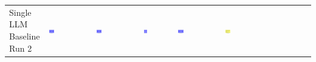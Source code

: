 \begin{table}
\begin{tabular}{@{}mmmmmm@{}}
    \makecell{Single LLM \\ Baseline \\ Run 2} & \includegraphics[width=0.13\textwidth]{./run_2/png/gpt-4o_results/MicrofluidicChip.png} & \includegraphics[width=0.13\textwidth]{./run_2/png/o1-preview_results/MicrofluidicChip.png} & \includegraphics[width=0.13\textwidth]{./run_2/png/claude-3-5-sonnet-20240620_results/MicrofluidicChip.png} & \includegraphics[width=0.13\textwidth]{./run_2/png/watsonx_meta-llama_llama-3-1-70b-instruct_results/MicrofluidicChip.png} & \includegraphics[width=0.13\textwidth]{./run_2/png/watsonx_meta-llama_llama-3-405b-instruct_results/MicrofluidicChip.png} \\

\end{tabular}
\end{table}
